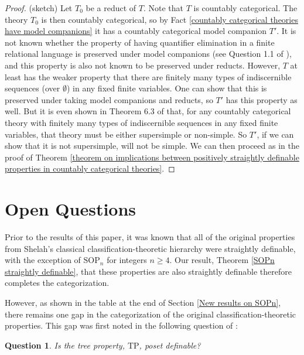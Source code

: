 \documentclass{article}
\newtheorem{question}{Question}
\theoremstyle{definition}
\theoremstyle{definition}
\theoremstyle{definition}
\begin{document}
\begin{proof}

(sketch) Let $T_{0}$ be a reduct of $T$.  Note that $T$ is countably categorical. The theory  $T_{0}$ is then countably categorical, so by Fact \ref{countably categorical theories have model companions} it has a countably categorical model companion $T'$. It is not known whether the property of having quantifier elimination in a finite relational language is preserved under model companions (see Question 1.1 of \cite{bodirsky2025taking}), and this property is also not known to be preserved under reducts. However, $T$ at least has the weaker property that there are finitely many types of indiscernible sequences (over $\emptyset$) in any fixed finite variables. One can show that this is preserved under taking model companions and reducts, so $T'$ has this property as well. But it is even shown in Theorem 6.3 of \cite{baldwin2024simple} that, for any countably categorical theory with finitely many types of indiscernible sequences in any fixed finite variables, that theory must be either supersimple or non-simple. So $T'$, if we can show that it is not supersimple, will not be simple. We can then proceed as in the proof of Theorem \ref{theorem on implications between positively straightly definable properties in countably categorical theories}.

    
\end{proof}




\section{Open Questions}\label{open questions}


Prior to the results of this paper, it was known that all of the original properties from Shelah's classical classification-theoretic hierarchy were straightly definable, with the exception of $\mathrm{SOP}_{n}$ for integers $n \geq 4$. Our result, Theorem \ref{SOPn straightly definable}, that these properties are also straightly definable therefore completes the categorization.

However, as shown in the table at the end of Section \ref{New results on SOPn}, there remains one gap in the categorization of the original classification-theoretic properties. This gap was first noted in the following question of \cite{garcia2022model}:

\begin{question}
    Is the tree property, $\mathrm{TP}$, poset definable? 
\end{question}
\end{document}
